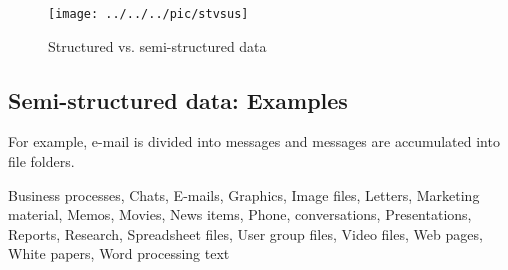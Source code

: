 \begin{figure}[H]
	\begin{center}
		\texttt{[image: ../../../pic/stvsus]}
	\end{center}
	\caption{Structured vs. semi-structured data}
\end{figure}






%


\subsection{Semi-structured data: Examples}
For example, e-mail is divided into messages and messages are accumulated into file folders. 

Business processes, Chats, E-mails, Graphics, Image files, Letters, Marketing material, Memos, Movies, News items, Phone, conversations, Presentations, Reports, Research, Spreadsheet files, 
User group files, Video files, Web pages, White papers, Word processing text

\pbn
{}




\pbn
